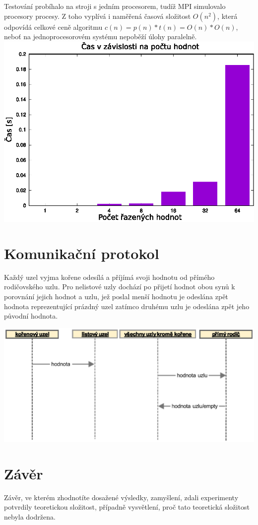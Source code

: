 \documentclass[12pt,a4paper,titlepage,final]{article}
\begin{document}
Testování probíhalo na stroji s jedním procesorem, tudíž MPI simulovalo procesory procesy. Z toho
vyplívá i naměřená časová složitost $O (n^2)$, která odpovídá celkové ceně algoritmu $c(n) = p(n)*t(n) = O (n) * O (n)$,
neboť na jednoprocesorovém systému nepoběží úlohy paralelně.
\includegraphics[width=14cm,keepaspectratio]{time.eps}

\section{Komunikační protokol}
Každý uzel vyjma kořene odesílá a příjímá svoji hodnotu od přímého rodičovského uzlu.
Pro nelistové uzly dochází po přijetí hodnot obou synů k porovnání jejich hodnot a 
uzlu, jež poslal menší hodnotu je odeslána zpět hodnota reprezentující prázdný uzel zatímco druhému uzlu
je odeslána zpět jeho původní hodnota.


\includegraphics[width=14cm,keepaspectratio]{sequence.eps}

\section{Závěr}
Závěr, ve kterém zhodnotíte dosažené výsledky, zamyšlení, zdali experimenty potvrdily teoretickou složitost, případně vysvětlení, proč tato teoretická složitost nebyla dodržena.
\end{document}
